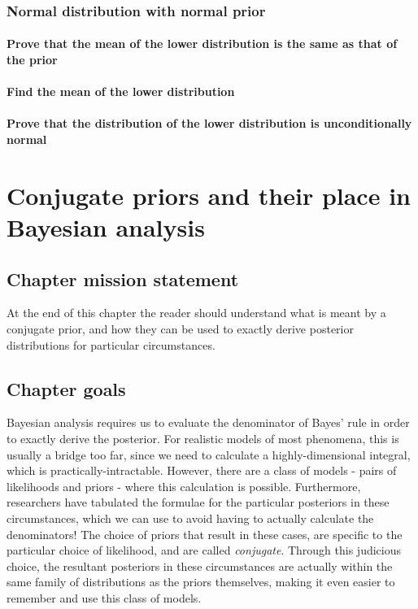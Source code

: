 \documentclass[11pt,fullpage]{book}
\begin{document}
\subsection{Normal distribution with normal prior}
\subsubsection{Prove that the mean of the lower distribution is the same as that of the prior}
\subsubsection{Find the mean of the lower distribution}
\subsubsection{Prove that the distribution of the lower distribution is unconditionally normal}

\chapter{Conjugate priors and their place in Bayesian analysis}\label{chap:conjugate}
\section{Chapter mission statement}
At the end of this chapter the reader should understand what is meant by a conjugate prior, and how they can be used to exactly derive posterior distributions for particular circumstances.

\section{Chapter goals}
Bayesian analysis requires us to evaluate the denominator of Bayes' rule in order to exactly derive the posterior. For realistic models of most phenomena, this is usually a bridge too far, since we need to calculate a highly-dimensional integral, which is practically-intractable. However, there are a class of models - pairs of likelihoods and priors - where this calculation is possible. Furthermore, researchers have tabulated the formulae for the particular posteriors in these circumstances, which we can use to avoid having to actually calculate the denominators! The choice of priors that result in these cases, are specific to the particular choice of likelihood, and are called \textit{conjugate}. Through this judicious choice, the resultant posteriors in these circumstances are actually within the same family of distributions as the priors themselves, making it even easier to remember and use this class of models. 
\end{document}
